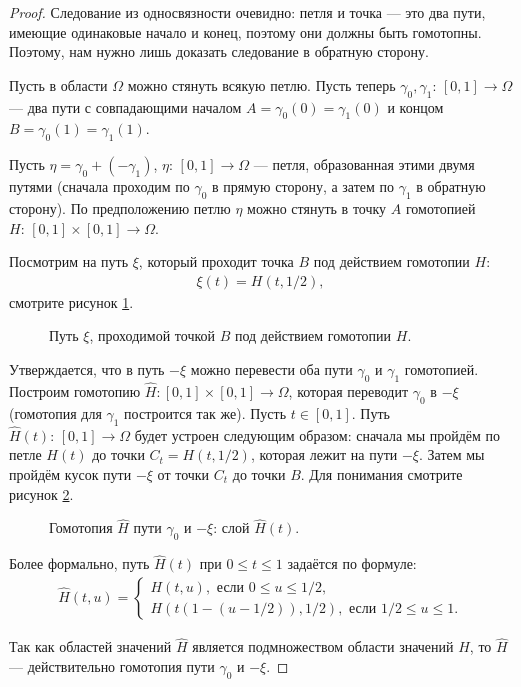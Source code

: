 \documentclass[../complex-analysis.tex]{subfiles}
\begin{document}
\begin{proof}
 Следование из односвязности очевидно: петля и точка --- это два пути, имеющие одинаковые начало и конец, поэтому они должны быть гомотопны. Поэтому, нам нужно лишь доказать следование в обратную сторону.

 Пусть в области $ \Omega $ можно стянуть всякую петлю. Пусть теперь $ \gamma_0, \gamma_1 \colon\, [0,1] \to \Omega $ --- два пути с совпадающими началом $ A = \gamma_0(0) = \gamma_1(0) $ и концом $ B = \gamma_0(1) = \gamma_1(1) $.

 Пусть $ \eta = \gamma_0 + (-\gamma_1)$, $ \eta \colon\, [0,1] \to \Omega $ --- петля, образованная этими двумя путями (сначала проходим по $ \gamma_0 $ в прямую сторону, а затем по $ \gamma_1 $ в обратную сторону). По предположению петлю $ \eta $ можно стянуть в точку $ A $ гомотопией $ H \colon\, [0,1] \times [0,1] \to \Omega $.

 Посмотрим на путь $ \xi $, который проходит точка $ B $ под действием гомотопии $ H $:
 \begin{align*}
  \xi(t) = H(t, 1 / 2),
 \end{align*} смотрите рисунок \ref{fig:central-path}.
 \begin{figure}[ht]
  \centering
  \caption{Путь $ \xi $, проходимой точкой $ B $ под действием гомотопии $ H $.}
  \label{fig:central-path}
 \end{figure}

 Утверждается, что в путь $ -\xi $ можно перевести оба пути $ \gamma_0 $ и $ \gamma_1 $ гомотопией. Построим гомотопию $ \hat H \colon [0,1] \times [0,1] \to \Omega $, которая переводит $ \gamma_0 $ в $ -\xi $ (гомотопия для $ \gamma_1 $ построится так же). Пусть $ t \in [0, 1] $. Путь $ \hat H(t) \colon\, [0,1] \to \Omega $ будет устроен следующим образом: сначала мы пройдём по петле $ H(t) $ до точки $ C_t = H(t, 1 / 2) $, которая лежит на пути $ -\xi $. Затем мы пройдём кусок пути $ -\xi $ от точки $ C_t $ до точки $ B $. Для понимания смотрите рисунок \ref{fig:homotopy_to_central_path}.

 \begin{figure}[ht]
  \centering
  \caption{Гомотопия $ \hat H $ пути $ \gamma_0 $ и $ -\xi $: слой $ \hat H(t) $.}
  \label{fig:homotopy_to_central_path}
 \end{figure}

 Более формально, путь $ \hat H(t) $ при $0 \leqslant t \leqslant 1$ задаётся по формуле:
 \begin{align*}
  \hat H(t, u) = \begin{cases}
   H(t, u), \text{ если } 0 \leqslant u \leqslant 1 / 2, \\
   H(t(1 - (u - 1 / 2)), 1 / 2), \text{ если } 1 / 2 \leqslant u \leqslant 1.
  \end{cases} 
 \end{align*}

 Так как областей значений $ \hat H $ является подмножеством области значений $ H$, то $ \hat H $ --- действительно гомотопия пути $ \gamma_0 $ и $ -\xi $.

\end{proof}
\end{document}
